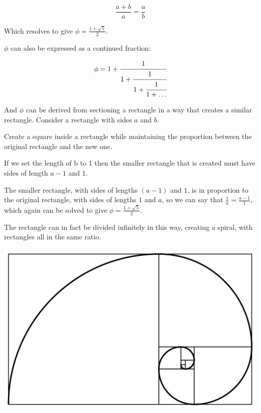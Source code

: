 \documentclass{article}
\begin{document}
\begin{enumerate}
$$\frac{a+b}{a}=\frac{a}{b}$$

Which resolves to give $\phi=\frac{1+\sqrt{5}}{2}.$

$\phi$ can also be expressed as a continued fraction:

\begin{equation*}
\phi = 1 + \cfrac{1}{1 + \cfrac{1}{1 + \cfrac{1}{1 + \ldots}}}
\end{equation*}

And $\phi$ can be derived from sectioning a rectangle in a way that creates a similar rectangle. Consider a rectangle with sides $a$ and $b$.

Create a square inside a rectangle while maintaining the proportion between the original rectangle and the new one.

If we set the length of b to 1 then the smaller rectangle that is created must have sides of length $a-1$ and $1$.

\begin{center}
\end{center}

The smaller rectangle, with sides of lengths $(a-1)$ and $1$, is in proportion to the original rectangle, with sides of lengths $1$ and $a$, so we can say that $\frac{1}{a}=\frac{a-1}{1}$, which again can be solved to give $\phi=\frac{1+\sqrt{5}}{2}$.

The rectangle can in fact be divided infinitely in this way, creating a spiral, with rectangles all in the same ratio.

\includegraphics[width=\textwidth]{Ratio-1024x648.png}


\end{enumerate}
\end{document}
